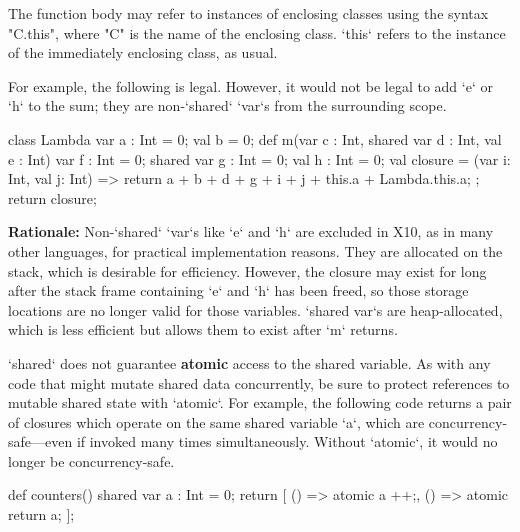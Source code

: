 The function body may refer to instances of enclosing classes using
the syntax \xcd"C.this", where \xcd"C" is the name of the
enclosing class.  \xcd`this` refers to the instance of the immediately
enclosing class, as usual.

For example, the following is legal.  However, it would not be legal to add
\xcd`e` or \xcd`h` to the sum; they are non-\xcd`shared` \xcd`var`s from the
surrounding scope.

\begin{xten}
class Lambda {
   var a : Int = 0;
   val b = 0;
   def m(var c : Int, shared var d : Int,  val e : Int) {
      var f : Int = 0;
      shared var g : Int = 0;
      val h : Int = 0;
      val closure = (var i: Int, val j: Int) => {
    	  return a + b + d + g + i + j + this.a + Lambda.this.a;
      };
      return closure;
   }
}
\end{xten}


{\bf Rationale:} Non-\xcd`shared` \xcd`var`s like \xcd`e` and \xcd`h` are
excluded in X10, as in many other languages, for practical implementation
reasons. They are allocated on the stack, which is desirable for efficiency.
However, the closure may exist for long after the stack frame containing
\xcd`e` and \xcd`h` has been freed, so those storage locations are no longer
valid for those variables. \xcd`shared var`s are heap-allocated, which is less
efficient but allows them to exist after \xcd`m` returns. 


\xcd`shared` does not guarantee {\bf atomic} access to the shared variable. As
with any code that might mutate shared data concurrently, be sure to protect
references to mutable shared state with \xcd`atomic`. For example, the
following code returns a pair of closures which operate on the same shared
variable \xcd`a`, which are concurrency-safe---even if invoked many times
simultaneously. Without \xcd`atomic`, it would no longer be concurrency-safe.


\begin{xten}
  def counters() {
      shared var a : Int = 0;
       return [
          () => {atomic a ++;},
          () => {atomic return a;}
          ];
   }
\end{xten}
%



